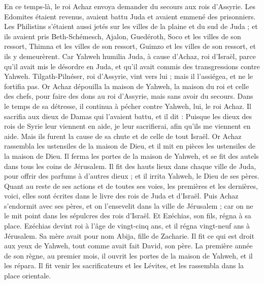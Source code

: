 \begin{multicols}{2}
En ce temps-là, le roi Achaz envoya demander du secours aux rois d'Assyrie.
Les Edomites étaient revenus, avaient battu Juda et avaient emmené des prisonniers.
Les Philistins s'étaient aussi jetés sur les villes de la plaine et du sud de Juda ; et ils avaient pris Beth-Schémesch, Ajalon, Guedéroth, Soco et les villes de son ressort, Thimna et les villes de son ressort, Guimzo et les villes de son ressort, et ils y demeurèrent.
Car Yahweh humilia Juda, à cause d'Achaz, roi d'Israël, parce qu'il avait mis le désordre en Juda, et qu'il avait commis des transgressions contre Yahweh.
Tilgath-Pilnéser, roi d'Assyrie, vint vers lui ; mais il l'assiégea, et ne le fortifia pas.
Or Achaz dépouilla la maison de Yahweh, la maison du roi et celle des chefs, pour faire des dons au roi d'Assyrie, mais sans avoir du secours.
Dans le temps de sa détresse, il continua à pécher contre Yahweh, lui, le roi Achaz.
Il sacrifia aux dieux de Damas qui l'avaient battu, et il dit : Puisque les dieux des rois de Syrie leur viennent en aide, je leur sacrifierai, afin qu'ils me viennent en aide. Mais ils furent la cause de sa chute et de celle de tout Israël.
Or Achaz rassembla les ustensiles de la maison de Dieu, et il mit en pièces les ustensiles de la maison de Dieu. Il ferma les portes de la maison de Yahweh, et se fit des autels dans tous les coins de Jérusalem.
Il fit des hauts lieux dans chaque ville de Juda, pour offrir des parfums à d'autres dieux ; et il irrita Yahweh, le Dieu de ses pères.
Quant au reste de ses actions et de toutes ses voies, les premières et les dernières, voici, elles sont écrites dans le livre des rois de Juda et d'Israël.
Puis Achaz s'endormit avec ses pères, et on l'ensevelit dans la ville de Jérusalem ; car on ne le mit point dans les sépulcres des rois d'Israël. Et Ezéchias, son fils, régna à sa place.
\VerseOne{}Ezéchias devint roi à l'âge de vingt-cinq ans, et il régna vingt-neuf ans à Jérusalem. Sa mère avait pour nom Abija, fille de Zacharie.
Il fit ce qui est droit aux yeux de Yahweh, tout comme avait fait David, son père.
La première année de son règne, au premier mois, il ouvrit les portes de la maison de Yahweh, et il les répara.
Il fit venir les sacrificateurs et les Lévites, et les rassembla dans la place orientale.

\end{multicols}
